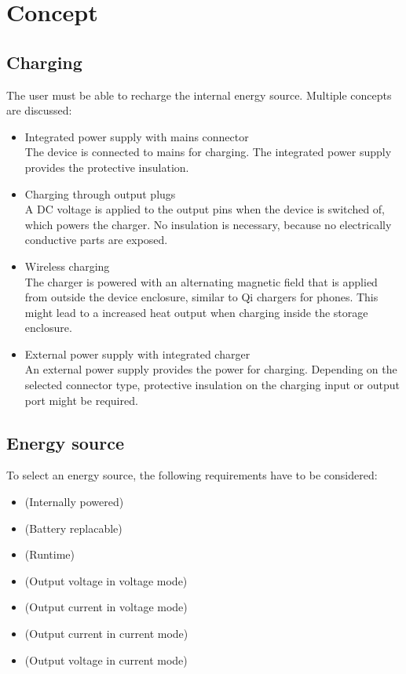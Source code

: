 \section{Concept}
\label{sec:concept}

\subsection{Charging}
The user must be able to recharge the internal energy source. Multiple concepts are discussed: 

\begin{itemize}
    \item Integrated power supply with mains connector
        \\
        The device is connected to mains for charging. The integrated power supply provides the protective insulation. 
    \item Charging through output plugs
        \\
        A DC voltage is applied to the output pins when the device is switched of, which powers the charger. No insulation is necessary, because no electrically conductive parts are exposed. 
    \item Wireless charging
        \\
        The charger is powered with an alternating magnetic field that is applied from outside the device enclosure, similar to Qi chargers for phones. This might lead to a increased heat output when charging inside the storage enclosure. 
    \item External power supply with integrated charger
        \\
        An external power supply provides the power for charging. Depending on the selected connector type, protective insulation on the charging input or output port might be required. 
\end{itemize}

\subsection{Energy source}
To select an energy source, the following requirements have to be considered: 
\begin{itemize}
    \item {} (Internally powered)
    \item {} (Battery replacable)
    \item {} (Runtime)
    \item {} (Output voltage in voltage mode)
    \item {} (Output current in voltage mode)
    \item {} (Output current in current mode)
    \item {} (Output voltage in current mode)
\end{itemize}

